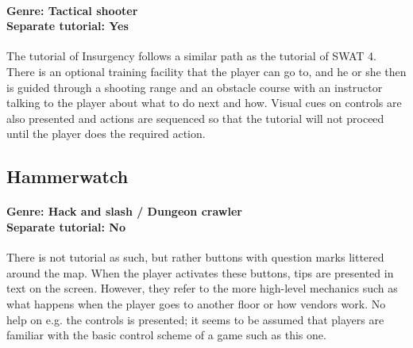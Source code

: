 \paragraph{Genre: Tactical shooter \\ Separate tutorial: Yes \\}
The tutorial of Insurgency follows a similar path as the tutorial of SWAT 4. There is an optional training facility that the player can go to, and he or she then is guided through a shooting range and an obstacle course with an instructor talking to the player about what to do next and how. Visual cues on controls are also presented and actions are sequenced so that the tutorial will not proceed until the player does the required action. 

\subsection{Hammerwatch}
\paragraph{Genre: Hack and slash / Dungeon crawler \\ Separate tutorial: No \\}
There is not tutorial as such, but rather buttons with question marks littered around the map. When the player activates these buttons, tips are presented in text on the screen. However, they refer to the more high-level mechanics such as what happens when the player goes to another floor or how vendors work. No help on e.g. the controls is presented; it seems to be assumed that players are familiar with the basic control scheme of a game such as this one.




